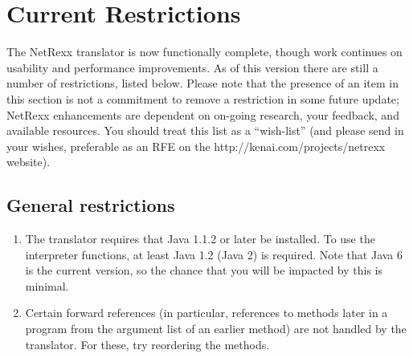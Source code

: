 \chapter{Current Restrictions}\label{restrictions}
The NetRexx translator is now functionally complete, though work continues on usability and performance improvements. As of this version there are still a number of restrictions, listed below. 
Please note that the presence of an item in this section is not a commitment to remove a restriction in some future update; NetRexx enhancements are dependent on on-going research, your feedback, and available resources. You should treat this list as a “wish-list” (and please send in your wishes, preferable as an RFE on the http://kenai.com/projects/netrexx website). 
\section{General restrictions}
\begin{enumerate}
\item The translator requires that Java 1.1.2 or later be installed. To use the interpreter functions, at least Java 1.2 (Java 2) is required. Note that Java 6 is the current version, so the chance that you will be impacted by this is minimal. 
\item Certain forward references (in particular, references to methods later in a program from the argument list of an earlier method) are not handled by the translator. For these, try reordering the methods.
\end{enumerate}
